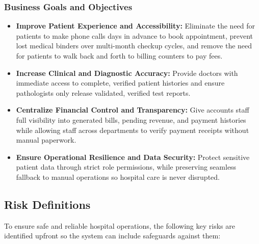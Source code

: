 \documentclass[11pt,a4paper]{article}
\begin{document}
\subsubsection{Business Goals and Objectives}
\begin{itemize}

    \item \textbf{Improve Patient Experience and Accessibility:} Eliminate the need for patients to make phone calls days in advance to book appointment, prevent lost medical binders over multi-month checkup cycles, and remove the need for patients to walk back and forth to billing counters to pay fees.

    \item \textbf{Increase Clinical and Diagnostic Accuracy:} Provide doctors with immediate access to complete, verified patient histories and ensure pathologists only release validated, verified test reports.

    \item \textbf{Centralize Financial Control and Transparency:} Give accounts staff full visibility into generated bills, pending revenue, and payment histories while allowing staff across departments to verify payment receipts without manual paperwork.

    \item \textbf{Ensure Operational Resilience and Data Security:} Protect sensitive patient data through strict role permissions, while preserving seamless fallback to manual operations so hospital care is never disrupted.

\end{itemize}

\subsection{Risk Definitions}
To ensure safe and reliable hospital operations, the following key risks are identified upfront so the system can include safeguards against them:
\end{document}
